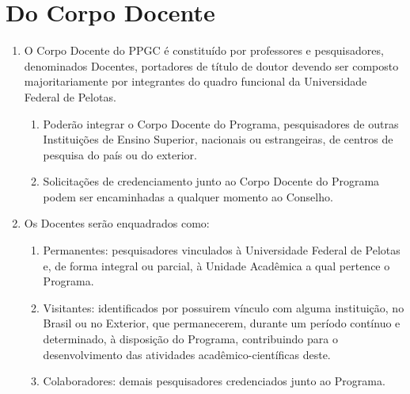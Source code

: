 \documentclass{article}
\newcommand{\grupoMaior}{Conselho\xspace}
\begin{document}
\section{Do Corpo Docente}

\begin{enumerate}
	\item O Corpo Docente do PPGC é constituído por professores e pesquisadores, denominados Docentes, portadores de título de doutor devendo ser composto majoritariamente por integrantes do quadro funcional da Universidade Federal de Pelotas.

	\begin{enumerate}
		\item Poderão integrar o Corpo Docente do Programa, pesquisadores de outras Instituições de Ensino Superior, nacionais ou estrangeiras, de centros de pesquisa do país ou do exterior.

		\item Solicitações de credenciamento junto ao Corpo Docente do Programa podem ser encaminhadas a qualquer momento ao \grupoMaior.
	\end{enumerate}


	\item Os Docentes serão enquadrados como:

	\begin{enumerate}[label=\Roman*]

		\item Permanentes: pesquisadores vinculados à Universidade Federal de Pelotas e, de forma integral ou parcial, à Unidade Acadêmica a qual pertence o Programa.

		\item Visitantes: identificados por possuirem vínculo com alguma instituição, no Brasil ou no Exterior, que permanecerem, durante um período contínuo e determinado, à disposição do Programa, contribuindo para o desenvolvimento das atividades acadêmico-científicas deste.	
		
		\item Colaboradores: demais pesquisadores credenciados junto ao Programa.


\end{enumerate}
\end{enumerate}
\end{document}
